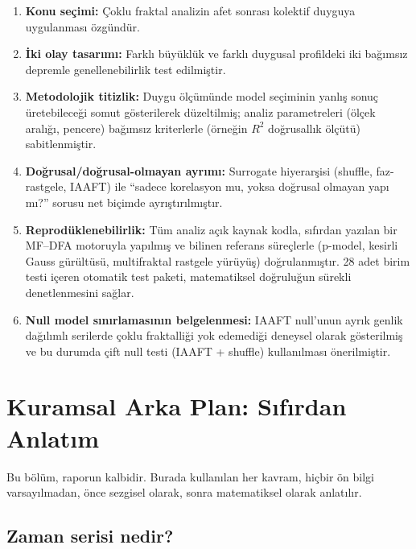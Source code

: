 \documentclass[11pt,a4paper]{article}
\begin{document}
\begin{enumerate}[leftmargin=1.6em]
  \item \textbf{Konu seçimi:} Çoklu fraktal analizin afet sonrası kolektif
        duyguya uygulanması özgündür.
  \item \textbf{İki olay tasarımı:} Farklı büyüklük ve farklı duygusal
        profildeki iki bağımsız depremle genellenebilirlik test edilmiştir.
  \item \textbf{Metodolojik titizlik:} Duygu ölçümünde model seçiminin
        yanlış sonuç üretebileceği somut gösterilerek düzeltilmiş; analiz
        parametreleri (ölçek aralığı, pencere) bağımsız kriterlerle
        (örneğin $R^2$ doğrusallık ölçütü) sabitlenmiştir.
  \item \textbf{Doğrusal/doğrusal-olmayan ayrımı:} Surrogate hiyerarşisi
        (shuffle, faz-rastgele, IAAFT) ile ``sadece korelasyon mu, yoksa
        doğrusal olmayan yapı mı?'' sorusu net biçimde ayrıştırılmıştır.
  \item \textbf{Reprodüklenebilirlik:} Tüm analiz açık kaynak kodla,
        sıfırdan yazılan bir MF--DFA motoruyla yapılmış ve bilinen referans
        süreçlerle (p-model, kesirli Gauss gürültüsü, multifraktal rastgele
        yürüyüş) doğrulanmıştır. 28 adet birim testi içeren otomatik test
        paketi, matematiksel doğruluğun sürekli denetlenmesini sağlar.
  \item \textbf{Null model sınırlamasının belgelenmesi:} IAAFT null'unun
        ayrık genlik dağılımlı serilerde çoklu fraktalliği yok edemediği
        deneysel olarak gösterilmiş ve bu durumda çift null testi
        (IAAFT + shuffle) kullanılması önerilmiştir.
\end{enumerate}

\section{Kuramsal Arka Plan: Sıfırdan Anlatım}

Bu bölüm, raporun kalbidir. Burada kullanılan her kavram, hiçbir ön bilgi
varsayılmadan, önce sezgisel olarak, sonra matematiksel olarak anlatılır.

\subsection{Zaman serisi nedir?}
\end{document}
